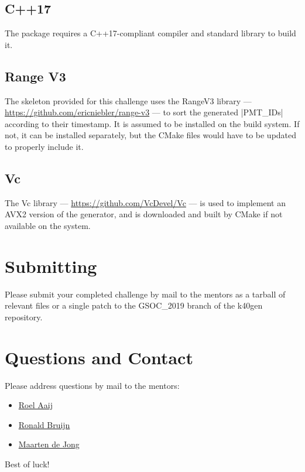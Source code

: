 \documentclass{article}
\begin{document}
\subsection{C++17}
The package requires a C++17-compliant compiler and standard library
to build it.

\subsection{Range V3}
The skeleton provided for this challenge uses the RangeV3 library —
\href{https://github.com/ericniebler/range-v3}{https://github.com/ericniebler/range-v3}
— to sort the generated |PMT_IDs| according to their timestamp. It is
assumed to be installed on the build system. If not, it can be
installed separately, but the CMake files would have to be updated to
properly include it.

\subsection{Vc}
The Vc library —
\href{https://github.com/VcDevel/Vc}{https://github.com/VcDevel/Vc} —
is used to implement an AVX2 version of the generator, and is
downloaded and built by CMake if not available on the system.

\section{Submitting}

Please submit your completed challenge by mail to the mentors as a
tarball of relevant files or a single patch to the GSOC\_2019 branch of
the k40gen repository.

\section{Questions and Contact}

Please address questions by mail to the mentors:
\begin{itemize}
\item \href{mailto:roel.aaij@nikhef.nl}{Roel Aaij}
\item \href{mailto:rbruijn@nikhef.nl}{Ronald Bruijn}
\item \href{mailto:m.de.jong@nikhef.nl}{Maarten de Jong}
\end{itemize}

\noindent Best of luck!
\end{document}
